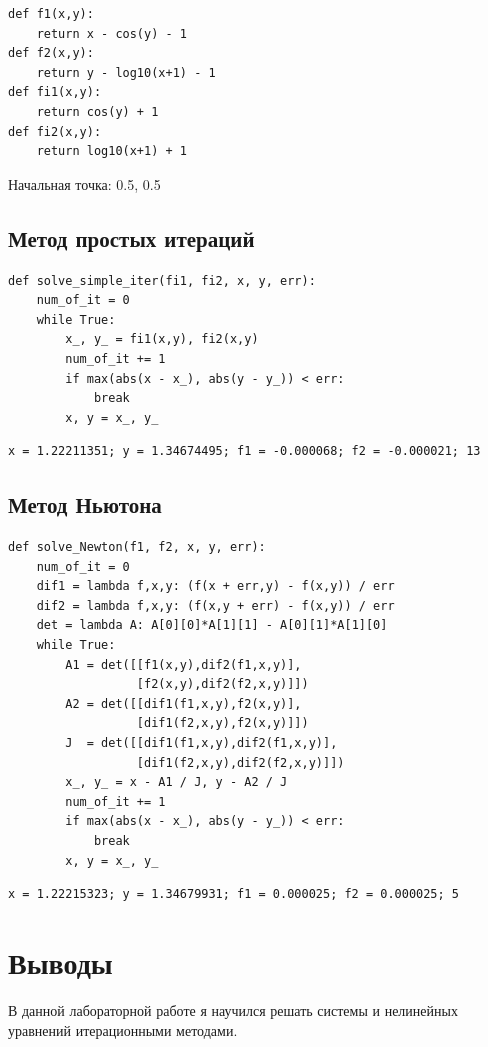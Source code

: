 \documentclass[pdf, unicode, 12pt, a4paper,oneside,fleqn]{article}
\begin{document}
\begin{lstlisting}
def f1(x,y):
    return x - cos(y) - 1
def f2(x,y):
    return y - log10(x+1) - 1
def fi1(x,y):
    return cos(y) + 1
def fi2(x,y):
    return log10(x+1) + 1
\end{lstlisting}

Начальная точка: 0.5, 0.5

\subsection{Метод простых итераций}

\begin{lstlisting}
def solve_simple_iter(fi1, fi2, x, y, err):
    num_of_it = 0
    while True:
        x_, y_ = fi1(x,y), fi2(x,y)
        num_of_it += 1
        if max(abs(x - x_), abs(y - y_)) < err:
            break
        x, y = x_, y_
\end{lstlisting}

\begin{lstlisting}
x = 1.22211351; y = 1.34674495; f1 = -0.000068; f2 = -0.000021; 13
\end{lstlisting}

\subsection{Метод Ньютона}

\begin{lstlisting}
def solve_Newton(f1, f2, x, y, err):
    num_of_it = 0
    dif1 = lambda f,x,y: (f(x + err,y) - f(x,y)) / err 
    dif2 = lambda f,x,y: (f(x,y + err) - f(x,y)) / err 
    det = lambda A: A[0][0]*A[1][1] - A[0][1]*A[1][0] 
    while True:
        A1 = det([[f1(x,y),dif2(f1,x,y)],
                  [f2(x,y),dif2(f2,x,y)]])
        A2 = det([[dif1(f1,x,y),f2(x,y)],
                  [dif1(f2,x,y),f2(x,y)]])
        J  = det([[dif1(f1,x,y),dif2(f1,x,y)],
                  [dif1(f2,x,y),dif2(f2,x,y)]])
        x_, y_ = x - A1 / J, y - A2 / J
        num_of_it += 1
        if max(abs(x - x_), abs(y - y_)) < err:
            break
        x, y = x_, y_
\end{lstlisting}

\begin{lstlisting}
x = 1.22215323; y = 1.34679931; f1 = 0.000025; f2 = 0.000025; 5
\end{lstlisting}

\section{Выводы}

В данной лабораторной работе я научился решать системы и нелинейных уравнений итерационными методами.
\end{document}
